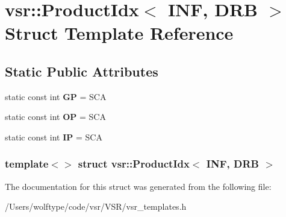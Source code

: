 \hypertarget{structvsr_1_1_product_idx_3_01_i_n_f_00_01_d_r_b_01_4}{\section{vsr\-:\-:Product\-Idx$<$ I\-N\-F, D\-R\-B $>$ Struct Template Reference}
\label{structvsr_1_1_product_idx_3_01_i_n_f_00_01_d_r_b_01_4}
}
\subsection*{Static Public Attributes}
\begin{DoxyCompactItemize}
\item 
\hypertarget{structvsr_1_1_product_idx_3_01_i_n_f_00_01_d_r_b_01_4_a98a0ffad4877ccc8f5777bb7707f2f43}{static const int {\bfseries G\-P} = S\-C\-A}\label{structvsr_1_1_product_idx_3_01_i_n_f_00_01_d_r_b_01_4_a98a0ffad4877ccc8f5777bb7707f2f43}

\item 
\hypertarget{structvsr_1_1_product_idx_3_01_i_n_f_00_01_d_r_b_01_4_aee57157bbc3a4f6dc9423fc89aa802fe}{static const int {\bfseries O\-P} = S\-C\-A}\label{structvsr_1_1_product_idx_3_01_i_n_f_00_01_d_r_b_01_4_aee57157bbc3a4f6dc9423fc89aa802fe}

\item 
\hypertarget{structvsr_1_1_product_idx_3_01_i_n_f_00_01_d_r_b_01_4_acdb00673af1af997e3783ee6bceaad40}{static const int {\bfseries I\-P} = S\-C\-A}\label{structvsr_1_1_product_idx_3_01_i_n_f_00_01_d_r_b_01_4_acdb00673af1af997e3783ee6bceaad40}

\end{DoxyCompactItemize}
\subsubsection*{template$<$$>$ struct vsr\-::\-Product\-Idx$<$ I\-N\-F, D\-R\-B $>$}



The documentation for this struct was generated from the following file\-:\begin{DoxyCompactItemize}
\item 
/\-Users/wolftype/code/vsr/\-V\-S\-R/vsr\-\_\-templates.\-h\end{DoxyCompactItemize}
